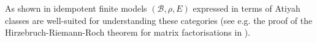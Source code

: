 \documentclass[english,letter paper,12pt,leqno]{article}
\theoremstyle{example}
\newtheorem{remark}[theorem]{Remark}
\numberwithin{equation}{section}
\def\AA{\mathcal{A}}
\def\BB{\mathcal{B}}
\def\HH{\HH}
\def\HH{\mathcal{H}}
\begin{document}
As shown in \cite{pushforward} idempotent finite models $(\BB, \rho, E)$ expressed in terms of Atiyah classes are well-suited for understanding these categories (see e.g. the proof of the Hirzebruch-Riemann-Roch theorem for matrix factorisations in \cite{??}).






\end{document}
